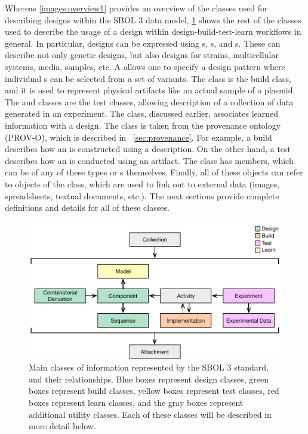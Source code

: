 Whereas \ref{images:overview1} provides an overview of the classes used for describing designs within the SBOL 3 data model,  \ref{images:overview2} shows the rest of the classes used to describe the usage of a design within design-build-test-learn workflows in general.
In particular, designs can be expressed using s, s, and s.
These can describe not only genetic designs, but also designs for strains, multicellular systems, media, samples, etc.
A  allows one to specify a design pattern where individual s can be selected from a set of variants.  
The  class is the build class, and it is used to represent physical artifacts like an actual sample of a plasmid.  
The  and  classes are the test classes, allowing description of a collection of data generated in an experiment.  
The  class, discussed earlier, associates learned information with a design.
The  class is taken from the provenance ontology (PROV-O), which is described in ~\ref{sec:provenance}. For example, a build  describes how an  is constructed using a  description.  On the other hand, a test  describes how an  is conducted using an  artifact.  The  class has members, which can be of any of these types or s themselves.  
Finally, all of these objects can refer to objects of the  class, which are used to link out to external data (images, spreadsheets, textual documents, etc.). 
The next sections provide complete definitions and details for all of these classes.

\begin{figure}[ht]
\begin{center}
\includegraphics[scale=0.85]{images/SBOL3-top-levels.pdf}
\caption{Main classes of information represented by the SBOL 3 standard, and their relationships.  Blue boxes represent design classes, green boxes represent build classes, yellow boxes represent test classes, red boxes represent learn classes, and the gray boxes represent additional utility classes.  Each of these classes will be described in more detail below.}
\label{images:overview2}
\end{center}
\end{figure}
